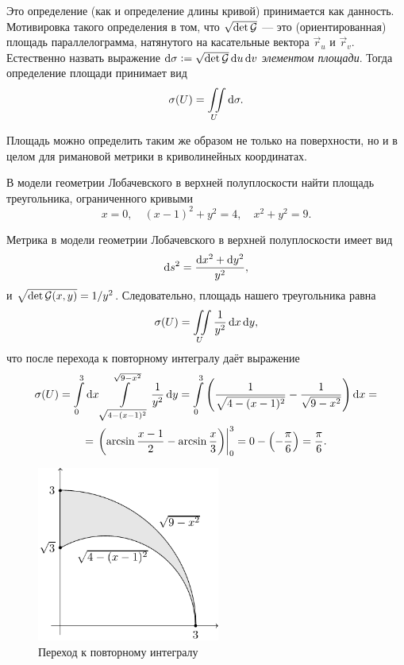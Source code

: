 Это определение (как и определение длины кривой) принимается как данность. Мотивировка такого определения в том, что $\sqrt{\det\mathcal{G}}$ --- это (ориентированная) площадь параллелограмма, натянутого на касательные вектора $\vec{r}_u$ и $\vec{r}_v$. Естественно назвать выражение $\mathop{}\!\mathrm{d}\sigma \vcentcolon = \sqrt{\det\mathcal{G}}\mathop{}\!\mathrm{d} u\mathop{}\!\mathrm{d} v$ \textit{элементом площади}. Тогда определение площади принимает вид
\[
	\sigma(U) = \iint\limits_{U}\mathop{}\!\mathrm{d}\sigma.
\]

Площадь можно определить таким же образом не только на поверхности, но и в целом для римановой метрики в криволинейных координатах.

\begin{problem} \label{problem:AreaTriangle}
	В модели геометрии Лобачевского в верхней полуплоскости найти площадь треугольника, ограниченного кривыми
	\[
		x = 0,\quad (x - 1)^2 + y^2 = 4,\quad x^2 + y^2 = 9.
	\]
\end{problem}

\begin{solution}
	Метрика в модели геометрии Лобачевского в верхней полуплоскости имеет вид
	\[
		\mathop{}\!\mathrm{d} s^2 = \frac{\mathop{}\!\mathrm{d} x^2 + \mathop{}\!\mathrm{d} y^2}{y^2},
	\]
	и $\sqrt{\det\mathcal{G}(x, y)} = 1 / y^2$. Следовательно, площадь нашего треугольника равна
	\[
		\sigma(U) = \iint\limits_{U}\frac{1}{y^2}\mathop{}\!\mathrm{d} x\mathop{}\!\mathrm{d} y,
	\]
	что после перехода к повторному интегралу даёт выражение
	\begin{multline*}
		\sigma(U) = \int\limits_0^3 \mathop{}\!\mathrm{d} x\int\limits_{\sqrt{4 - (x - 1)^2}}^{\sqrt{9 - x^2}}\frac{1}{y^2}\mathop{}\!\mathrm{d} y = \int\limits_0^3\left(\frac{1}{\sqrt{4 - (x - 1)^2}} - \frac{1}{\sqrt{9 - x^2}}\right)\mathop{}\!\mathrm{d} x =\\ = \left.\left(\arcsin\frac{x - 1}{2} - \arcsin\frac{x}{3}\right)\right|_0^3 = 0 - \left(-\frac{\pi}{6}\right) = \frac{\pi}{6}.
	\end{multline*}

	\begin{figure}[H]
		\centering
		\includegraphics[width=6cm]{./img/CurveTriangle.pdf}
		\caption{Переход к повторному интегралу}
	\end{figure}
\end{solution}

